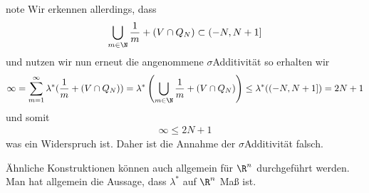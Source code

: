 \documentclass[letterpaper,10pt,german]{jupyterBook}
\begin{document}
\begin{sphinxadmonition}{note}
Wir erkennen allerdings, dass
\begin{equation*}
\begin{split}\bigcup_{m\in\N} \frac{1}{m}+(V\cap Q_N) \subset (-N,N+1]\end{split}
\end{equation*}
\sphinxAtStartPar
und nutzen wir nun erneut die angenommene \(\sigma\)\sphinxhyphen{}Additivität so erhalten wir
\begin{equation*}
\begin{split}\infty = \sum_{m=1}^\infty \lambda^\ast(\frac{1}{m}+(V\cap Q_N)) = 
\lambda^\ast\left(\bigcup_{m\in\N}  \frac{1}{m}+(V\cap Q_N) \right)\leq 
\lambda^\ast((-N,N+1]) = 2N + 1\end{split}
\end{equation*}
\sphinxAtStartPar
und somit
\begin{equation*}
\begin{split}\infty \leq 2N + 1\end{split}
\end{equation*}
\sphinxAtStartPar
was ein Widerspruch ist. Daher ist die Annahme der \(\sigma\)\sphinxhyphen{}Additivität falsch.
\end{sphinxadmonition}

\sphinxAtStartPar
Ähnliche Konstruktionen können auch allgemein für \(\R^n\) durchgeführt werden. Man hat allgemein die Aussage, dass \(\lambda^\ast\) auf \(\R^n\)  Maß ist.
\end{document}
